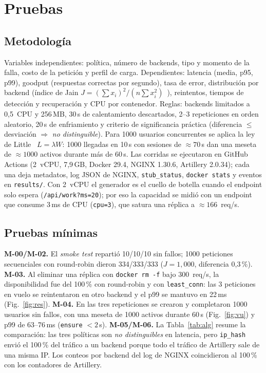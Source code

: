 \documentclass[conference]{IEEEtran}
\begin{document}
\section{Pruebas}\label{sec:pruebas}
\subsection{Metodología}
Variables independientes: política, número de backends, tipo y momento de la falla, costo de la petición y perfil de carga. Dependientes: latencia (media, p95, p99), goodput (respuestas correctas por segundo), tasa de error, distribución por backend (índice de Jain $J=(\sum x_i)^2/(n\sum x_i^2)$~\cite{jain1984}), reintentos, tiempos de detección y recuperación y CPU por contenedor. Reglas: backends limitados a 0,5~CPU y 256\,MB, 30\,s de calentamiento descartados, 2--3 repeticiones en orden aleatorio, 20\,s de enfriamiento y criterio de significancia práctica (diferencia $\le$ desviación $\Rightarrow$ \emph{no distinguible}). Para 1000 usuarios concurrentes se aplica la ley de Little~\cite{little1961} $L=\lambda W$: 1000 llegadas en 10\,s con sesiones de $\approx 70$\,s dan una meseta de $\approx 1000$ activos durante más de 60\,s. Las corridas se ejecutaron en GitHub Actions (2~vCPU, 7,9\,GB, Docker 29.4, NGINX 1.30.6, Artillery 2.0.34); cada una deja metadatos, log JSON de NGINX, \texttt{stub\_status}, \texttt{docker stats} y eventos en \texttt{results/}. Con 2~vCPU el generador es el cuello de botella cuando el endpoint solo espera (\texttt{/api/work?ms=20}); por eso la capacidad se midió con un endpoint que consume 3\,ms de CPU (\texttt{cpu=3}), que satura una réplica a $\approx 166$~req/s.

\subsection{Pruebas mínimas}
\textbf{M-00/M-02.} El \emph{smoke test} repartió 10/10/10 sin fallos; 1000 peticiones secuenciales con round-robin dieron 334/333/333 ($J=1{,}000$, diferencia 0,3\,\%). \textbf{M-03.} Al eliminar una réplica con \texttt{docker rm -f} bajo 300~req/s, la disponibilidad fue del 100\,\% con round-robin y con \texttt{least\_conn}: las 3 peticiones en vuelo se reintentaron en otro backend y el p99 se mantuvo en 22\,ms (Fig.~\ref{fig:res}). \textbf{M-04.} En las tres repeticiones se crearon y completaron 1000 usuarios sin fallos, con una meseta de 1000 activos durante 60\,s (Fig.~\ref{fig:vu}) y p99 de 63--76\,ms (\texttt{ensure} $<2$\,s). \textbf{M-05/M-06.} La Tabla~\ref{tab:alg} resume la comparación: las tres políticas son \emph{no distinguibles} en latencia, pero \texttt{ip\_hash} envió el 100\,\% del tráfico a un backend porque todo el tráfico de Artillery sale de una misma IP. Los conteos por backend del log de NGINX coincidieron al 100\,\% con los contadores de Artillery.
\end{document}
